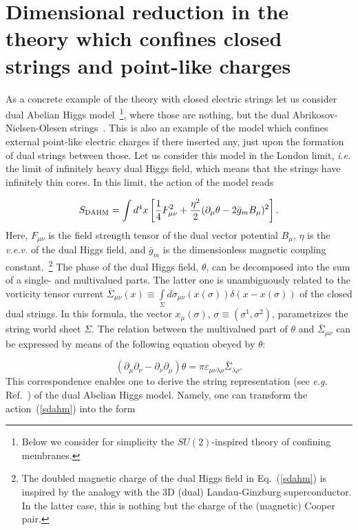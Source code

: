 \documentclass[a4paper,12pt]{article}
\begin{document}
\section{Dimensional reduction in the theory which confines closed strings and point-like charges}

As a concrete example of the theory with closed electric strings let us consider dual Abelian
Higgs model~\footnote{Below we consider for simplicity the $SU(2)$-inspired theory of confining membranes.}, 
where those are nothing, but the dual Abrikosov-Nielsen-Olesen strings~\cite{ano}.
This is also an example of the model which confines external point-like electric charges if there inserted any, just upon the 
formation of dual strings between those.
Let us consider this model in the London limit, {\it i.e.} the limit  
of infinitely heavy dual Higgs field, which means that the strings have infinitely thin cores.
In this limit, the action of the model reads

\begin{equation}
\label{sdahm}
S_{\rm DAHM}=\int d^4x\left[\frac14F_{\mu\nu}^2+\frac{\eta^2}{2}(\partial_\mu\theta-2\bar g_mB_\mu)^2\right].
\end{equation}
Here, $F_{\mu\nu}$ is the field strength tensor of the dual vector potential $B_\mu$, $\eta$ is the 
{\it v.e.v.} of the dual Higgs field, and $\bar g_m$ is the dimensionless magnetic coupling constant.~\footnote{The doubled 
magnetic charge of the dual Higgs field in Eq.~(\ref{sdahm}) is inspired by the analogy with the 3D (dual) Landau-Ginzburg
superconductor. In the latter case, this is nothing but the charge of the (magnetic) Cooper pair.}  
The phase of the dual Higgs field, $\theta$, can be decomposed into the sum of a single- and multivalued
parts. The latter one is unambiguously related to the vorticity tensor current
$\bar\Sigma_{\mu\nu}(x)\equiv\int\limits_{\Sigma}^{}d\sigma_{\mu\nu}(x(\sigma))\delta(x-x(\sigma))$ of the 
closed dual strings. In this formula, 
the vector $x_\mu(\sigma)$, $\sigma\equiv\left(\sigma^1,\sigma^2\right)$, parametrizes the string world
sheet $\Sigma$. The relation between the multivalued part of $\theta$ and $\bar\Sigma_{\mu\nu}$ 
can be expressed by means of the following equation obeyed by $\theta$:

\begin{equation}
\label{rel}
(\partial_\mu\partial_\nu-\partial_\nu\partial_\mu)\theta=\pi\varepsilon_{\mu\nu\lambda\rho}
\bar\Sigma_{\lambda\rho}.
\end{equation}
This correspondence enables one to derive the string representation 
(see {\it e.g.} Ref.~\cite{orl}) of the dual Abelian Higgs model. Namely, one can transform 
the action~(\ref{sdahm}) into the form 
\end{document}

